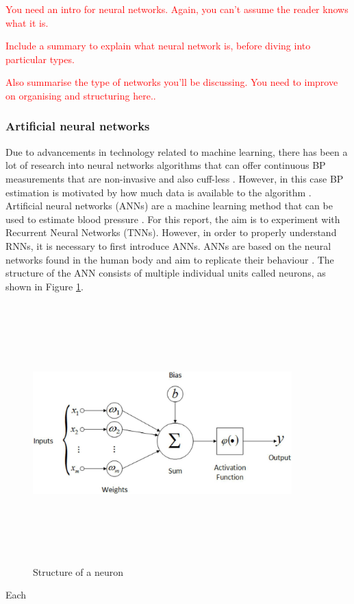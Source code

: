  \textcolor{red}{You need an intro for neural networks. Again, you can't assume the reader knows what it is.}

 \textcolor{red}{Include a summary to explain what neural network is, before diving into particular types.}

 \textcolor{red}{Also summarise the type of networks you'll be discussing. You need to improve on organising and structuring here..}

 \subsubsection{Artificial neural networks}
 Due to advancements in technology related to machine learning, there has 
 been a lot of research into neural networks algorithms that can offer 
 continuous BP measurements that are non-invasive and also 
 cuff-less \cite{Pradenas2020}. However, in this case BP 
 estimation is motivated by how much data is available to the 
 algorithm \cite{ElHajj2020}. \\ \newline \noindent Artificial neural 
 networks (ANNs) are a machine learning method that can be used to estimate 
 blood pressure \cite{Pradenas2020}. For this report, the aim is to experiment 
 with Recurrent Neural Networks (TNNs). However, in order to properly understand RNNs, 
 it is necessary to first introduce ANNs. ANNs are based on the neural networks 
 found in the human body and aim to replicate their behaviour \cite{Yang2020}. The 
 structure of the ANN consists of multiple individual units called neurons, as shown in Figure 
 \ref{neuron}.  \begin{figure}[H]
    \centering
    \includegraphics[width=10cm,height=10cm,keepaspectratio]{Background/neuron.jpeg}
    \caption{Structure of a neuron \cite{Almusawi2020}}
    \label{neuron}
\end{figure}\noindent Each 
